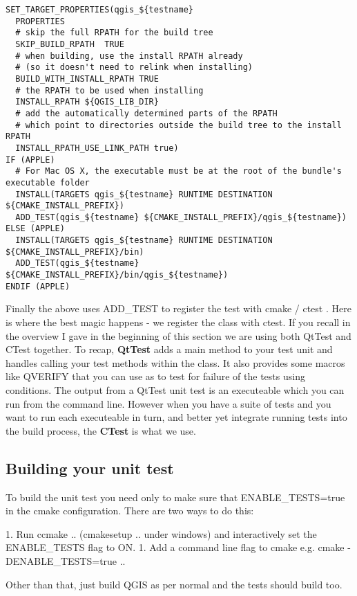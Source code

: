 \begin{verbatim}
SET_TARGET_PROPERTIES(qgis_${testname}
  PROPERTIES
  # skip the full RPATH for the build tree
  SKIP_BUILD_RPATH  TRUE
  # when building, use the install RPATH already
  # (so it doesn't need to relink when installing)
  BUILD_WITH_INSTALL_RPATH TRUE
  # the RPATH to be used when installing
  INSTALL_RPATH ${QGIS_LIB_DIR}
  # add the automatically determined parts of the RPATH
  # which point to directories outside the build tree to the install RPATH
  INSTALL_RPATH_USE_LINK_PATH true)
IF (APPLE)
  # For Mac OS X, the executable must be at the root of the bundle's executable folder
  INSTALL(TARGETS qgis_${testname} RUNTIME DESTINATION ${CMAKE_INSTALL_PREFIX})
  ADD_TEST(qgis_${testname} ${CMAKE_INSTALL_PREFIX}/qgis_${testname})
ELSE (APPLE)
  INSTALL(TARGETS qgis_${testname} RUNTIME DESTINATION ${CMAKE_INSTALL_PREFIX}/bin)
  ADD_TEST(qgis_${testname} ${CMAKE_INSTALL_PREFIX}/bin/qgis_${testname})
ENDIF (APPLE)
\end{verbatim}

Finally the above uses ADD\_TEST to register the test with cmake / ctest . Here
is where the best magic happens - we register the class with ctest. If you
recall in the overview I gave in the beginning of this section we are using
both QtTest and CTest together. To recap, \textbf{QtTest} adds a main method to your
test unit and handles calling your test methods within the class. It also
provides some macros like QVERIFY that you can use as to test for failure of
the tests using conditions. The output from a QtTest unit test is an
executeable which you can run from the command line.  However when you have a
suite of tests and you want to run each executeable in turn, and better yet
integrate running tests into the build process, the \textbf{CTest} is what we use. 

\hypertarget{toc52}{}
\subsection{Building your unit test}
To build the unit test you need only to make sure that ENABLE\_TESTS=true in the
cmake configuration. There are two ways to do this:

 1. Run ccmake .. (cmakesetup .. under windows) and interactively set 
 the ENABLE\_TESTS flag to ON.
 1. Add a command line flag to cmake e.g. cmake -DENABLE\_TESTS=true ..

Other than that, just build QGIS as per normal and the tests should build too.

